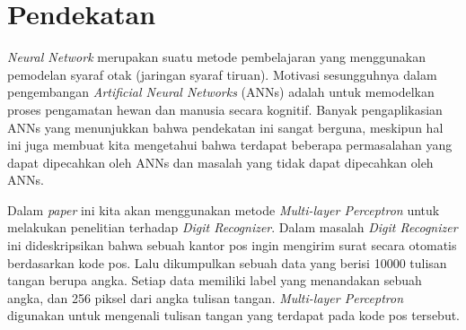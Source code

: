 
\graphicspath{ {images/} }
\section{Pendekatan}
	\textit{Neural Network} merupakan suatu metode pembelajaran yang menggunakan pemodelan syaraf otak (jaringan syaraf tiruan). Motivasi sesungguhnya dalam pengembangan \textit{Artificial Neural Networks} (ANNs) adalah untuk memodelkan proses pengamatan hewan dan manusia secara kognitif. Banyak pengaplikasian ANNs yang menunjukkan bahwa pendekatan ini sangat berguna, meskipun hal ini juga membuat kita mengetahui bahwa terdapat beberapa permasalahan yang dapat dipecahkan oleh ANNs dan masalah yang tidak dapat dipecahkan oleh ANNs.
	\par Dalam \textit{paper} ini kita akan menggunakan metode \textit{Multi-layer Perceptron} untuk melakukan penelitian terhadap \textit{Digit Recognizer}. Dalam masalah \textit{Digit Recognizer} ini dideskripsikan bahwa sebuah kantor pos ingin mengirim surat secara otomatis berdasarkan kode pos. Lalu dikumpulkan sebuah data yang berisi 10000 tulisan tangan berupa angka. Setiap data memiliki label yang menandakan sebuah angka, dan 256 piksel dari angka tulisan tangan. \textit{Multi-layer Perceptron} digunakan untuk mengenali tulisan tangan yang terdapat pada kode pos tersebut.
	
